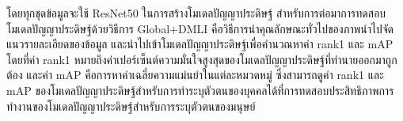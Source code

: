 โดยทุกชุดข้อมูลจะใช้ ResNet50 ในการสร้างโมเดลปัญญาประดิษฐ์ สำหรับการต่อมาการทดสอบโมเดลปัญญาประดิษฐ์ด้วยวิธีการ Global+DMLI คือวิธีการนำคุณลักษณะทั่วไปของภาพนำไปจัดแนวรายละเอียดของข้อมูล และนำไปเข้าโมเดลปัญญาประดิษฐ์เพื่อคำนวณหาค่า rank1 และ mAP โดยที่ค่า rank1 หมายถึงค่าเปอร์เซ็นต์ความมั่นใจสูงสุดของโมเดลปัญญาประดิษฐ์ที่ทำนายออกมาถูกต้อง และค่า mAP คือการหาค่าเฉลี่ยความแม่นยำในแต่ละหมวดหมู่ ซึ่งสามารถดูค่า rank1 และ mAP ของโมเดลปัญญาประดิษฐ์สำหรับการทำระบุตัวตนของบุคคลได้ที่การทดสอบประสิทธิภาพการทำงานของโมเดลปัญญาประดิษฐ์สำหรับการระบุตัวตนของมนุษย์